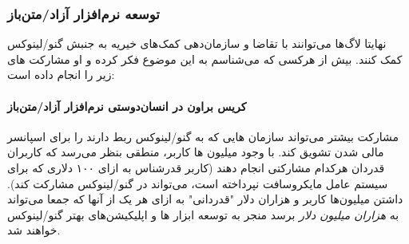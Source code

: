 \subsubsection{توسعه نرم‌افزار آزاد/متن‌باز}

نهایتا لاگ‌ها می‌توانند با تقاضا و سازمان‌دهی کمک‌های خیریه
به جنبش گنو/لینوکس کمک کنند.
بیش از هرکسی که می‌شناسم به این موضوع فکر کرده و او مشارکت
های زیر را انجام داده است:

\paragraph{کریس براون در انسان‌دوستی نرم‌افزار آزاد/متن‌باز}

مشارکت بیشتر می‌تواند سازمان هایی که به گنو/لینوکس ربط دارند را
برای اسپانسر مالی شدن تشویق کند. با وجود میلیون ها کاربر، منطقی
بنظر می‌رسد که کاربران قدردان هرکدام مشارکتی انجام دهند
(کاربر قدرشناس به ازای ۱۰۰ دلاری که برای سیستم عامل مایکروسافت
نپرداخته است، می‌تواند در گنو/لینوکس مشارکت کند).
داشتن میلیون‌ها کاربر و هزاران دلار "قدردانی" به ازای هر یک از آنها
که جمعا می‌تواند به
{\itshape هزاران میلیون دلار}
برسد منجر به توسعه ابزار ها و اپلیکیشن‌های بهتر گنو/لینوکس خواهند شد.


